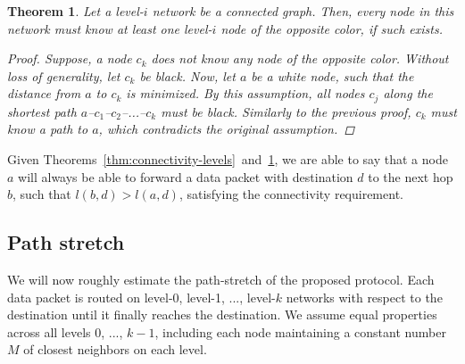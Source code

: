 \documentclass[conference]{IEEEtran}
\newtheorem{thm}{Theorem}
\theoremstyle{definition}
\begin{document}
\begin{thm}
    Let a level-$i$ network be a connected graph. Then, every node in this network must know at least one level-$i$ node of the opposite color, if such exists.

    \begin{proof}
        Suppose, a node $c_k$ does not know any node of the opposite color. Without loss of generality, let $c_k$ be black. Now, let $a$ be a white node, such that the distance from $a$ to $c_k$ is minimized. By this assumption, all nodes $c_j$ along the shortest path $a$--$c_1$--$c_2$--...--$c_k$ must be black. Similarly to the previous proof, $c_k$ must know a path to $a$, which contradicts the original assumption.
    \end{proof}

    \label{thm:connectivity-colors}
\end{thm}

Given Theorems~\ref{thm:connectivity-levels}~and~\ref{thm:connectivity-colors}, we are able to say that a node $a$ will always be able to forward a data packet with destination $d$ to the next hop $b$, such that $l(b,d) > l(a,d)$, satisfying the connectivity requirement.


\subsection{Path stretch}
\label{sec:analysis:stretch}

We will now roughly estimate the path-stretch of the proposed protocol. Each data packet is routed on level-0, level-1, ..., level-$k$ networks with respect to the destination until it finally reaches the destination. We assume equal properties across all levels 0, ..., $k - 1$, including each node maintaining a constant number $M$ of closest neighbors on each level.
\end{document}
